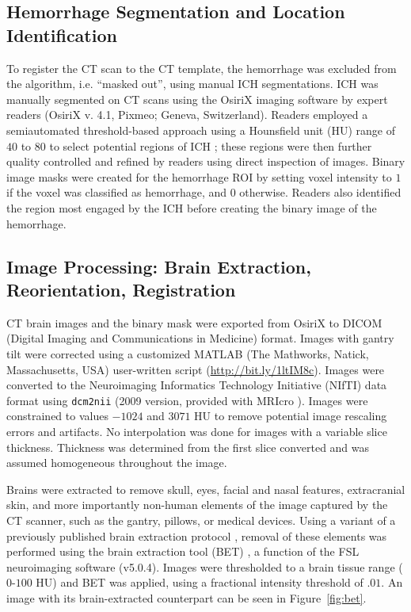 \documentclass[10pt]{article}\usepackage[]{graphicx}\usepackage[]{color}
\begin{document}
\subsection{Hemorrhage Segmentation and Location Identification}
To register the CT scan to the CT template, the hemorrhage was excluded from the algorithm, i.e. ``masked out'', using manual ICH segmentations.  ICH was manually segmented on CT scans using the OsiriX imaging software by expert readers (OsiriX v. 4.1, Pixmeo; Geneva, Switzerland).  Readers employed a semiautomated threshold-based approach using a Hounsfield unit (HU) range of $40$ to $80$ to select potential regions of ICH \citep{bergstrom_variation_1977, smith_imaging_2006}; these regions were then further quality controlled and refined by readers using direct inspection of images.  Binary image masks were created for the hemorrhage ROI by setting voxel intensity to $1$ if the voxel was classified as hemorrhage, and $0$ otherwise.  Readers also identified the region most engaged by the ICH before creating the binary image of the hemorrhage.

\subsection{Image Processing: Brain Extraction, Reorientation, Registration}
CT brain images and the binary mask were exported from OsiriX to DICOM (Digital Imaging and Communications in Medicine) format.  Images with gantry tilt were corrected using a customized MATLAB (The Mathworks, Natick, Massachusetts, USA) user-written script (\url{http://bit.ly/1ltIM8c}). 
Images were converted to the Neuroimaging Informatics Technology Initiative (NIfTI) data format using \verb|dcm2nii| (2009 version, provided with MRIcro \citep{rorden_stereotaxic_2000}).  Images were constrained to values $-1024$ and $3071$ HU to remove potential image rescaling errors and artifacts.  No interpolation was done for images with a variable slice thickness. Thickness was determined from the first slice converted and was assumed homogeneous throughout the image.  

Brains were extracted to remove skull, eyes, facial and nasal features, extracranial skin, and more importantly non-human elements of the image captured by the CT scanner, such as the gantry, pillows, or medical devices.  Using a variant of a previously published brain extraction protocol \citep{rorden_age-specific_2012}, removal of these elements was performed using the brain extraction tool (BET) \citep{smith_fast_2002}, a function of the FSL \citep{jenkinson_fsl_2012} neuroimaging software (v5.0.4).  Images were thresholded to a brain tissue range ($0$-$100$ HU) and BET was applied, using a fractional intensity threshold of $.01$.  An image with its brain-extracted counterpart can be seen in Figure~\ref{fig:bet}.  
\end{document}

